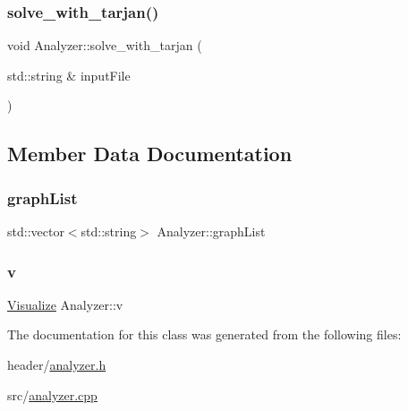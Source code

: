 \subsubsection{\texorpdfstring{solve\+\_\+with\+\_\+tarjan()}{solve\_with\_tarjan()}}
{\footnotesize\ttfamily void Analyzer\+::solve\+\_\+with\+\_\+tarjan (\begin{DoxyParamCaption}\item[{std\+::string \&}]{input\+File }\end{DoxyParamCaption})}



\subsection{Member Data Documentation}
\mbox{\label{class_analyzer_a567b5d8b2bbdde28b489834c1644446e_a567b5d8b2bbdde28b489834c1644446e}} 
\subsubsection{\texorpdfstring{graph\+List}{graphList}}
{\footnotesize\ttfamily std\+::vector$<$std\+::string$>$ Analyzer\+::graph\+List}

\mbox{\label{class_analyzer_ae32079d0816589617a0c76b1d4cf881b_ae32079d0816589617a0c76b1d4cf881b}} 
\subsubsection{\texorpdfstring{v}{v}}
{\footnotesize\ttfamily \hyperlink{class_visualize}{Visualize} Analyzer\+::v}



The documentation for this class was generated from the following files\+:\begin{DoxyCompactItemize}
\item 
header/\hyperlink{analyzer_8h}{analyzer.\+h}\item 
src/\hyperlink{analyzer_8cpp}{analyzer.\+cpp}\end{DoxyCompactItemize}
